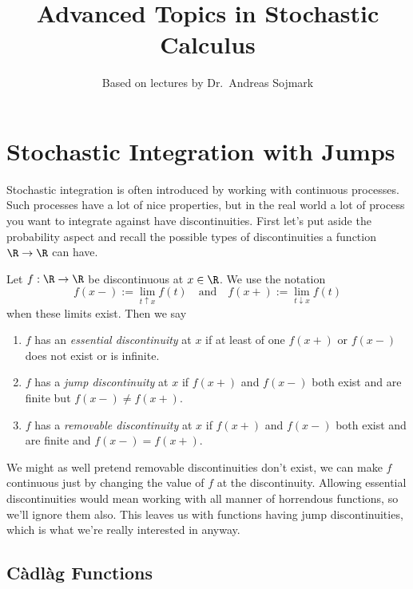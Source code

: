 \documentclass{scrreprt}
\title{Advanced Topics in Stochastic Calculus}
\author{Based on lectures by Dr.\ Andreas Sojmark}
\theoremstyle{remark}
\newcommand\defeq{:=}
\begin{document}
\maketitle

\clearpage\mbox{}\clearpage

\tableofcontents

\chapter{Stochastic Integration with Jumps}

Stochastic integration is often introduced by working with continuous processes. Such processes have a lot of nice properties, but in the real world a lot of process you want to integrate against have discontinuities. First let's put aside the probability aspect and recall the possible types of discontinuities a function $\R \to \R$ can have.

\begin{defn}
	Let $f: \R \to \R$ be discontinuous at $x \in \R$. We use the notation
	\begin{equation}
		f(x-) \defeq \lim_{t \uparrow x} f(t) \quad \text{and} \quad
		f(x+) \defeq \lim_{t \downarrow x} f(t)
	\end{equation}
	when these limits exist. Then we say
	\begin{enumerate}
		\item $f$ has an \emph{essential discontinuity} at $x$ if at least of one $f(x+)$ or $f(x-)$ does not exist or is infinite.
		\item $f$ has a \emph{jump discontinuity} at $x$ if $f(x+)$ and $f(x-)$ both exist and are finite but $f(x-) \neq f(x+)$.
		\item $f$ has a \emph{removable discontinuity} at $x$ if $f(x+)$ and $f(x-)$ both exist and are finite and $f(x-) = f(x+)$.
	\end{enumerate}
\end{defn}

We might as well pretend removable discontinuities don't exist, we can make $f$ continuous just by changing the value of $f$ at the discontinuity. Allowing essential discontinuities would mean working with all manner of horrendous functions, so we'll ignore them also. This leaves us with functions having jump discontinuities, which is what we're really interested in anyway.

\section{C\`adl\`ag Functions}
\end{document}
